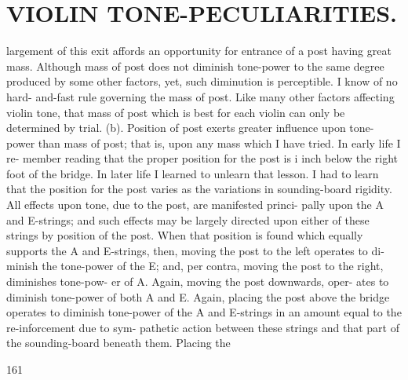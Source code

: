 \documentclass{article}
\begin{document}
\section*{VIOLIN TONE-PECULIARITIES.}
largement of this exit affords an opportunity for entrance of a post having great mass. Although mass of post does not diminish tone-power to the same degree produced by some other factors, yet, such diminution is perceptible. I know of no hard- and-fast rule governing the mass of post. Like many other factors affecting violin tone, that mass of post which is best for each violin can only be determined by trial. (b). Position of post exerts greater influence upon tone-power than mass of post; that is, upon any mass which I have tried. In early life I re- member reading that the proper position for the post is i inch below the right foot of the bridge. In later life I learned to unlearn that lesson. I had to learn that the position for the post varies as the variations in sounding-board rigidity. All effects upon tone, due to the post, are manifested princi- pally upon the A and E-strings; and such effects may be largely directed upon either of these strings by position of the post. When that position is found which equally supports the A and E-strings, then, moving the post to the left operates to di- minish the tone-power of the E; and, per contra, moving the post to the right, diminishes tone-pow- er of A. Again, moving the post downwards, oper- ates to diminish tone-power of both A and E. Again, placing the post above the bridge operates to diminish tone-power of the A and E-strings in an amount equal to the re-inforcement due to sym- pathetic action between these strings and that part of the sounding-board beneath them. Placing the

161
\end{document}
